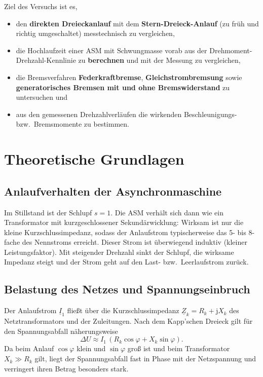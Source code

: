 \documentclass[11pt,a4paper]{article}
\begin{document}
Ziel des Versuchs ist es,
\begin{itemize}
  \item den \textbf{direkten Dreieckanlauf} mit dem \textbf{Stern-Dreieck-Anlauf}
        (zu früh und richtig umgeschaltet) messtechnisch zu vergleichen,
  \item die Hochlaufzeit einer ASM mit Schwungmasse vorab aus der
        Drehmoment-Drehzahl-Kennlinie zu \textbf{berechnen} und mit der Messung zu vergleichen,
  \item die Bremsverfahren \textbf{Federkraftbremse}, \textbf{Gleichstrombremsung} sowie
        \textbf{generatorisches Bremsen mit und ohne Bremswiderstand} zu untersuchen und
  \item aus den gemessenen Drehzahlverläufen die wirkenden Beschleunigungs- bzw.\ Bremsmomente zu bestimmen.
\end{itemize}

\section{Theoretische Grundlagen}
\subsection{Anlaufverhalten der Asynchronmaschine}
Im Stillstand ist der Schlupf $s = 1$. Die ASM verhält sich dann wie ein
Transformator mit kurzgeschlossener Sekundärwicklung: Wirksam ist nur die kleine
Kurzschlussimpedanz, sodass der Anlaufstrom typischerweise das 5- bis 8-fache des
Nennstroms erreicht. Dieser Strom ist überwiegend induktiv (kleiner
Leistungsfaktor). Mit steigender Drehzahl sinkt der Schlupf, die wirksame
Impedanz steigt und der Strom geht auf den Last- bzw.\ Leerlaufstrom zurück.

\subsection{Belastung des Netzes und Spannungseinbruch}
Der Anlaufstrom $\underline I_1$ fließt über die Kurzschlussimpedanz
$\underline Z_k = R_k + \mathrm{j}X_k$ des Netztransformators und der Zuleitungen.
Nach dem Kapp'schen Dreieck gilt für den Spannungsabfall näherungsweise
\begin{equation}
  \Delta U \approx I_1\,(R_k\cos\varphi + X_k\sin\varphi).
  \label{eq:kapp}
\end{equation}
Da beim Anlauf $\cos\varphi$ klein und $\sin\varphi$ groß ist und beim Transformator
$X_k \gg R_k$ gilt, liegt der Spannungsabfall fast in Phase mit der
Netzspannung und verringert ihren Betrag besonders stark.
\end{document}
